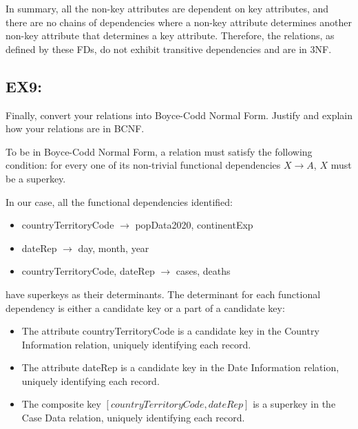 \documentclass{article}
\begin{document}
In summary, all the non-key attributes are dependent on key attributes, and there are no chains of dependencies where a non-key attribute determines another non-key attribute that determines a key attribute. Therefore, the relations, as defined by these FDs, do not exhibit transitive dependencies and are in 3NF.
    

 


\subsection{EX9:} Finally, convert your relations into Boyce-Codd Normal Form. Justify and explain how your relations are in BCNF.


\vspace{1mm}

To be in Boyce-Codd Normal Form, a relation must satisfy the following condition: for every one of its non-trivial functional dependencies \( X \rightarrow A \), \( X \) must be a superkey.

\vspace{1mm}

In our case, all the functional dependencies identified:

\vspace{5mm}

\begin{itemize}
  \item countryTerritoryCode \( \rightarrow \) popData2020, continentExp
  \item dateRep \( \rightarrow \) day, month, year
  \item countryTerritoryCode, dateRep \( \rightarrow \) cases, deaths
\end{itemize}

\vspace{5mm}

have superkeys as their determinants. The determinant for each functional dependency is either a candidate key or a part of a candidate key:

\vspace{5mm}

\begin{itemize}
  \item The attribute countryTerritoryCode is a candidate key in the Country Information relation, uniquely identifying each record.
  \item The attribute dateRep is a candidate key in the Date Information relation, uniquely identifying each record.
  \item The composite key \( [countryTerritoryCode, dateRep] \) is a superkey in the Case Data relation, uniquely identifying each record.
\end{itemize}
\end{document}
